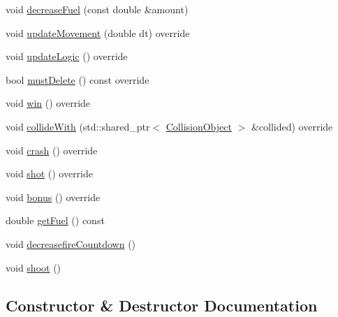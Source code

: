 \begin{DoxyCompactItemize}
\item 
void \hyperlink{classroadfighter_1_1PlayerCar_ab4c61f903639603aaa59f8222a2ecf94}{decrease\+Fuel} (const double \&amount)
\item 
void \hyperlink{classroadfighter_1_1PlayerCar_aa1dcbec01dde1b212e4919b61338edde}{update\+Movement} (double dt) override
\item 
void \hyperlink{classroadfighter_1_1PlayerCar_a01480487ca7978a50a3c6609f1ebe6df}{update\+Logic} () override
\item 
bool \hyperlink{classroadfighter_1_1PlayerCar_aaf4dc181a4d21e544aecd7a8e538cfd6}{must\+Delete} () const override
\item 
void \hyperlink{classroadfighter_1_1PlayerCar_a12f0da24565a4fe64a7bf17fc7c37152}{win} () override
\item 
void \hyperlink{classroadfighter_1_1PlayerCar_ab62e40d949ac12f402fdaaab15c69b81}{collide\+With} (std\+::shared\+\_\+ptr$<$ \hyperlink{classroadfighter_1_1CollisionObject}{Collision\+Object} $>$ \&collided) override
\item 
void \hyperlink{classroadfighter_1_1PlayerCar_a330d071af729d7afbfcfd7ef92516544}{crash} () override
\item 
void \hyperlink{classroadfighter_1_1PlayerCar_a592556a1c6326c9d9a70691f036eaafc}{shot} () override
\item 
void \hyperlink{classroadfighter_1_1PlayerCar_a0f0626a6ea7d25e3ba01a8289d54acac}{bonus} () override
\item 
double \hyperlink{classroadfighter_1_1PlayerCar_aefc7f96fae66baecef10861a6b1fa0f2}{get\+Fuel} () const
\item 
void \hyperlink{classroadfighter_1_1PlayerCar_a65725265e5af175119a4c87be9a74cfe}{decreasefire\+Countdown} ()
\item 
void \hyperlink{classroadfighter_1_1PlayerCar_a2fdc34f0a8256d3fa8e36378c3c64b10}{shoot} ()
\end{DoxyCompactItemize}


\subsection{Constructor \& Destructor Documentation}
\mbox{\label{classroadfighter_1_1PlayerCar_ada20f509f074df30613ecfe09e80c79e}} 
